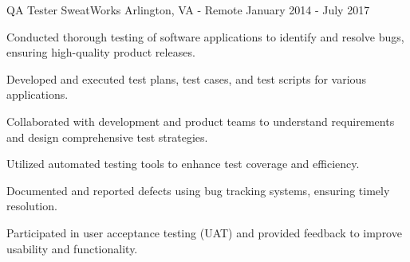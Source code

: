 \begin{cventries}
  \cventry
    {QA Tester} %
    {SweatWorks} %
    {Arlington, VA - Remote} %
    {January 2014 - July 2017} %
    {
      \begin{cvitems} %
        \item {Conducted thorough testing of software applications to identify and resolve bugs, ensuring high-quality product releases.}
        \item {Developed and executed test plans, test cases, and test scripts for various applications.}
        \item {Collaborated with development and product teams to understand requirements and design comprehensive test strategies.}
        \item {Utilized automated testing tools to enhance test coverage and efficiency.}
        \item {Documented and reported defects using bug tracking systems, ensuring timely resolution.}
        \item {Participated in user acceptance testing (UAT) and provided feedback to improve usability and functionality.}
      \end{cvitems}
    }

\end{cventries}
